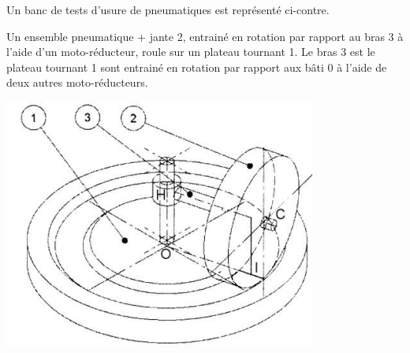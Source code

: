 \documentclass[10pt]{article}
\begin{document}
\begin{minipage}[c]{.7\linewidth}
Un banc de tests d’usure de pneumatiques est représenté ci-contre. 
 
Un ensemble pneumatique + jante 2, entrainé en rotation par rapport 
au bras 3 à l’aide d’un moto-réducteur, roule sur un plateau tournant 
1. 
Le bras 3 est le plateau tournant 1 sont entrainé en rotation par rapport 
aux bâti 0 à l’aide de deux autres moto-réducteurs.
\end{minipage}
\begin{minipage}[c]{.25\linewidth}
\begin{center}
\includegraphics[width=\textwidth]{images/fig_06}
\end{center}
\end{minipage}
\end{document}
